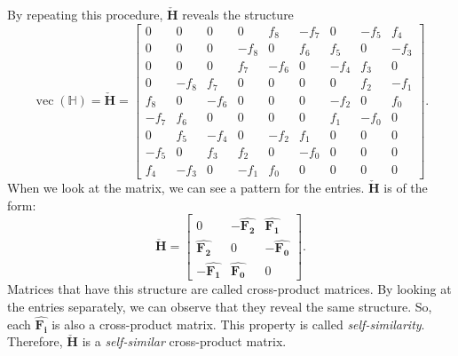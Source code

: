 {{{By repeating this procedure, $\mathbf{\check{H}}$ reveals the structure
\[
\operatorname{vec}(\mathbb{H}) = \mathbf{\check{H}} = \begin{bmatrix} 0 & 0 & 0 & 0 & f_8 & -f_7 & 0 & -f_5 & f_4 \\ 0 & 0 & 0 & -f_8 & 0 & f_6 & f_5 & 0 & -f_3 \\ 0 & 0 & 0 & f_7 & -f_6 & 0 & -f_4 & f_3 & 0 \\ 0 & -f_8 & f_7 & 0 & 0 & 0 & 0 & f_2 & -f_1 \\ f_8 & 0 & -f_6 & 0 & 0 & 0 & -f_2 & 0 & f_0 \\ -f_7 & f_6 & 0 & 0 & 0 & 0 & f_1 & -f_0 & 0 \\ 0 & f_5 & -f_4 & 0 & -f_2 & f_1 & 0 & 0 & 0 \\ -f_5 & 0 & f_3 & f_2 & 0 & -f_0 & 0 & 0 & 0 \\ f_4 & -f_3 & 0 & -f_1 & f_0 & 0 & 0 & 0 & 0 \end{bmatrix}.
\]
When we look at the matrix, we can see a pattern for the entries. $\mathbf{\check{H}}$ is of the form:
\[
\mathbf{\check{H}} = \left[ \begin{matrix}
0 & -\mathbf{\widehat{F_2}} & \mathbf{\widehat{F_1}} \\ \mathbf{\widehat{F_2}} & 0 & -\mathbf{\widehat{F_0}} \\ -\mathbf{\widehat{F_1}} & \mathbf{\widehat{F_0}} & 0 \end{matrix} \right].
\]
Matrices that have this structure are called cross-product matrices. By looking at the entries separately, we can observe that they reveal the same structure. So, each $\mathbf{\widehat{F_i}}$ is also a cross-product matrix. This property is called \textit{self-similarity}. Therefore, $\mathbf{\check{H}}$ is a \textit{self-similar} cross-product matrix. 

}}}
